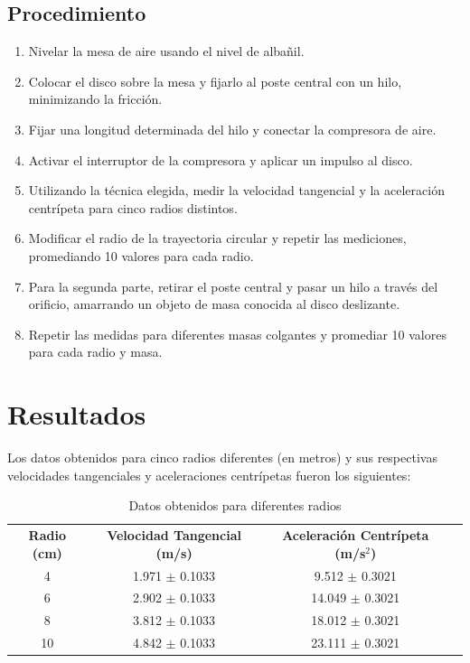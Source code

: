 \documentclass{article}
\begin{document}
\subsection{Procedimiento}
\begin{enumerate}
    \item Nivelar la mesa de aire usando el nivel de albañil.
    \item Colocar el disco sobre la mesa y fijarlo al poste central con un hilo, minimizando la fricción.
    \item Fijar una longitud determinada del hilo y conectar la compresora de aire.
    \item Activar el interruptor de la compresora y aplicar un impulso al disco.
    \item Utilizando la técnica elegida, medir la velocidad tangencial y la aceleración centrípeta para cinco radios distintos.
    \item Modificar el radio de la trayectoria circular y repetir las mediciones, promediando 10 valores para cada radio.
    \item Para la segunda parte, retirar el poste central y pasar un hilo a través del orificio, amarrando un objeto de masa conocida al disco deslizante.
    \item Repetir las medidas para diferentes masas colgantes y promediar 10 valores para cada radio y masa.
\end{enumerate}

\section*{Resultados}
Los datos obtenidos para cinco radios diferentes (en metros) y sus respectivas velocidades tangenciales y aceleraciones centrípetas fueron los siguientes:

\begin{table}[h]
\centering
\begin{tabular}{cccc}
\textbf{Radio (cm)} & \textbf{Velocidad Tangencial (m/s)} & \textbf{Aceleración Centrípeta (m/s\(^2\))} \\
4       & 1.971 $\pm$ 0.1033  & 9.512 $\pm$ 0.3021  \\
6       & 2.902 $\pm$ 0.1033  & 14.049 $\pm$ 0.3021 \\
8       & 3.812 $\pm$ 0.1033  & 18.012 $\pm$ 0.3021 \\
10      & 4.842 $\pm$ 0.1033  & 23.111 $\pm$ 0.3021 \\
\end{tabular}
\caption{Datos obtenidos para diferentes radios}
\label{tabla:resultados}
\end{table}
\end{document}
